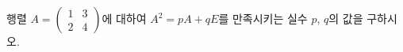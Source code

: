 \hspace*{2mm}\begin{minipage}[t]{\dimexpr\linewidth-2mm\relax}\vspace{0pt}
행렬 $A=\begin{pmatrix} 1 & 3 \\ 2 & 4 \end{pmatrix}$에 대하여 $A^2=pA+qE$를 만족시키는 실수 $p$, $q$의 값을 구하시오.\end{minipage}

